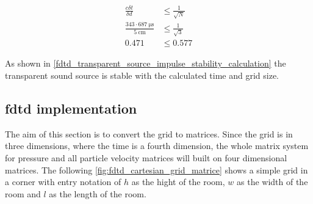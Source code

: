 \begin{subequations}\label{fdtd_transparent_source_impulse_stability_calculation}
\begin{alignat}{2}
\frac{c \delta t}{\delta d} &\leq \frac{1}{\sqrt{N}}\\
\frac{343 \cdot \SI{687}{\micro\second}}{\SI{5}{\centi\meter}} &\leq \frac{1}{\sqrt{3}}\\
0.471 &\leq 0.577
\end{alignat}
\end{subequations}

    \startexplain
    \stopexplain


As shown in \autoref{fdtd_transparent_source_impulse_stability_calculation} the transparent sound source is stable with the calculated time and grid size.




\subsection{\gls{fdtd} implementation}
The aim of this section is to convert the grid to matrices. Since the grid is in three dimensions, where the time is a fourth dimension, the whole matrix system for pressure and all particle velocity matrices will built on four dimensional matrices. The following \autoref{fig:fdtd_cartesian_grid_matrice} shows a simple grid in a corner with entry notation of $h$ as the hight of the room, $w$ as the width of the room and $l$ as the length of the room.


